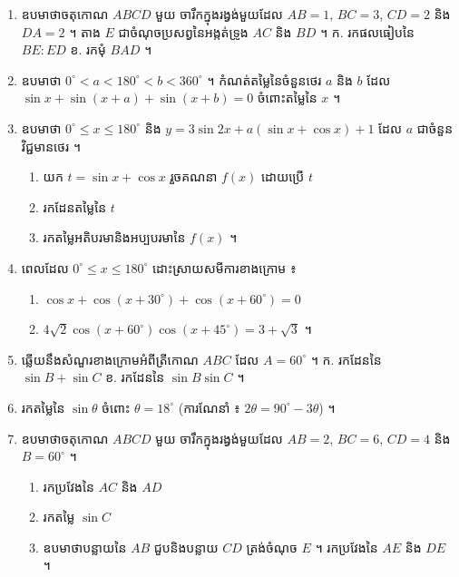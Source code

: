 \begin{enumerate}[1]
  \item ឧបមាថាចតុកោណ $ABCD$ មួយ ចារឹកក្នុងរង្វង់មួយដែល $AB = 1$, $BC = 3$, $CD = 2$ និង $DA = 2$ ។ តាង $E$ ជាចំណុចប្រសព្វនៃអង្កត់ទ្រូង $AC$ និង $BD$ ។ \quad ក. រកផលធៀបនៃ $BE : ED$ \quad ខ. រកមុំ $BAD$ ។
  \item ឧបមាថា $0^\circ < a < 180^\circ < b < 360^\circ$ ។ កំណត់តម្លៃនៃចំនួនថេរ $a$ និង $b$ ដែល $\sin x + \sin(x + a) + \sin(x + b) = 0$ ចំពោះតម្លៃនៃ $x$ ។
  \item ឧបមាថា $0^\circ \le x \le 180^\circ$ និង $y = 3\sin 2x + a(\sin x + \cos x) + 1$ ដែល $a$ ជាចំនួនវិជ្ជមានថេរ ។
  \begin{enumerate}[a]
    \item យក $t = \sin x + \cos x$ រួចគណនា $f(x)$ ដោយប្រើ $t$
    \item រកដែនតម្លៃនៃ $t$
    \item រកតម្លៃអតិបរមានិងអប្បបរមានៃ $f(x)$ ។
  \end{enumerate}
  \item ពេលដែល $0^\circ \le x \le 180^\circ$ ដោះស្រាយសមីការខាងក្រោម ៖
  \begin{enumerate}[a]
    \item $\cos x + \cos(x + 30^\circ) + \cos(x + 60^\circ) = 0$
    \item $4\sqrt{2}\cos(x + 60^\circ)\cos(x + 45^\circ) = 3 + \sqrt{3}$ ។
  \end{enumerate}
  \item ឆ្លើយនឹងសំណួរខាងក្រោមអំពីត្រីកោណ $ABC$ ដែល $A = 60^\circ$ ។ \quad ក. រកដែននៃ $\sin B + \sin C$ \quad ខ. រកដែននៃ $\sin B\sin C$ ។
  \item រកតម្លៃនៃ $\sin\theta$ ចំពោះ $\theta = 18^\circ$ (ការណែនាំ ៖ $2\theta = 90^\circ - 3\theta$) ។
  \item ឧបមាថាចតុកោណ $ABCD$ មួយ ចារឹកក្នុងរង្វង់មួយដែល $AB = 2$, $BC = 6$, $CD = 4$ និង $B = 60^\circ$ ។
  \begin{enumerate}[a]
    \item រកប្រវែងនៃ $AC$ និង $AD$
    \item រកតម្លៃ $\sin C$
    \item ឧបមាថាបន្លាយនៃ $AB$ ជួបនិងបន្លាយ $CD$ ត្រង់ចំណុច $E$ ។ រកប្រវែងនៃ $AE$ និង $DE$ ។
  \end{enumerate}
\end{enumerate}
